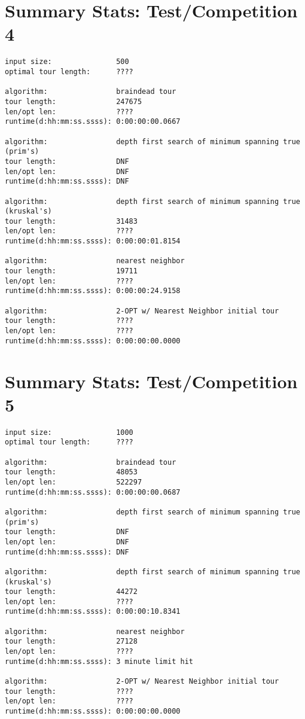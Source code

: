 \documentclass[12pt]{article}
\begin{document}
\newpage
\section*{Summary Stats: Test/Competition 4}
\begin{verbatim}
input size:               500
optimal tour length:      ????

algorithm:                braindead tour
tour length:              247675
len/opt len:              ????
runtime(d:hh:mm:ss.ssss): 0:00:00:00.0667

algorithm:                depth first search of minimum spanning true (prim's) 
tour length:              DNF
len/opt len:              DNF
runtime(d:hh:mm:ss.ssss): DNF

algorithm:                depth first search of minimum spanning true (kruskal's) 
tour length:              31483
len/opt len:              ????
runtime(d:hh:mm:ss.ssss): 0:00:00:01.8154

algorithm:                nearest neighbor 
tour length:              19711
len/opt len:              ????
runtime(d:hh:mm:ss.ssss): 0:00:00:24.9158

algorithm:                2-OPT w/ Nearest Neighbor initial tour
tour length:              ????
len/opt len:              ????
runtime(d:hh:mm:ss.ssss): 0:00:00:00.0000
\end{verbatim}

\newpage
\section*{Summary Stats: Test/Competition 5}
\begin{verbatim}
input size:               1000
optimal tour length:      ????

algorithm:                braindead tour
tour length:              48053
len/opt len:              522297
runtime(d:hh:mm:ss.ssss): 0:00:00:00.0687

algorithm:                depth first search of minimum spanning true (prim's) 
tour length:              DNF
len/opt len:              DNF
runtime(d:hh:mm:ss.ssss): DNF 

algorithm:                depth first search of minimum spanning true (kruskal's) 
tour length:              44272
len/opt len:              ????
runtime(d:hh:mm:ss.ssss): 0:00:00:10.8341

algorithm:                nearest neighbor 
tour length:              27128
len/opt len:              ????
runtime(d:hh:mm:ss.ssss): 3 minute limit hit

algorithm:                2-OPT w/ Nearest Neighbor initial tour
tour length:              ????
len/opt len:              ????
runtime(d:hh:mm:ss.ssss): 0:00:00:00.0000
\end{verbatim}
\end{document}
